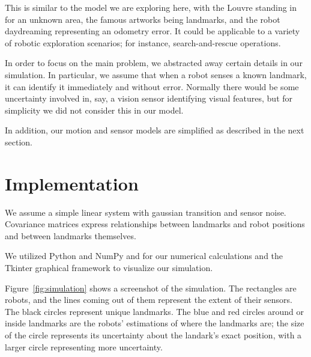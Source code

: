 \documentclass[prodmode,acmtecs]{acmsmall} %
\begin{document}
This is similar to the model we are exploring here, with the Louvre standing in for an unknown area, the famous artworks being landmarks, and the robot daydreaming representing an odometry error.  It could be applicable to a variety of robotic exploration scenarios; for instance, search-and-rescue operations.

In order to focus on the main problem, we abstracted away certain details in our simulation.  In particular, we assume that when a robot senses a known landmark, it can identify it immediately and without error.  Normally there would be some uncertainty involved in, say, a vision sensor identifying visual features, but for simplicity we did not consider this in our model.

In addition, our motion and sensor models are simplified as described in the next section.

\section{Implementation}

We assume a simple linear system with gaussian transition and sensor noise.  Covariance matrices express relationships between landmarks and robot positions and between landmarks themselves.  

We utilized Python and NumPy and for our numerical calculations and the Tkinter graphical framework to visualize our simulation.

Figure~\ref{fig:simulation} shows a screenshot of the simulation.  The rectangles are robots, and the lines coming out of them represent the extent of their sensors.  The black circles represent unique landmarks.  The blue and red circles around or inside landmarks are the robots' estimations of where the landmarks are; the size of the circle represents its uncertainty about the landark's exact position, with a larger circle representing more uncertainty.
\end{document}
